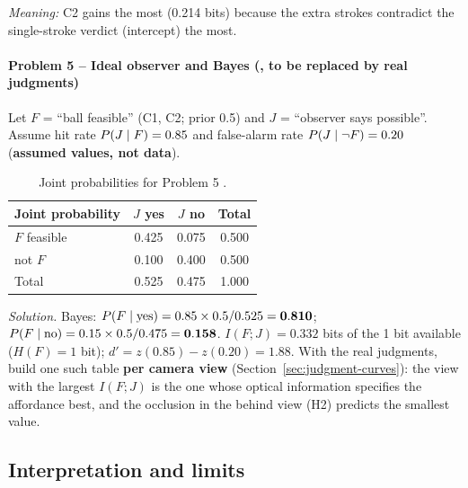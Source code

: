\emph{Meaning:} C2 gains the most (0.214 bits) because the extra strokes contradict the single-stroke verdict (intercept) the most.

\paragraph{Problem 5 -- Ideal observer and Bayes (\tagill{}, to be replaced by real judgments)} Let $F$ = ``ball feasible'' (C1, C2; prior 0.5) and $J$ = ``observer says possible''. Assume hit rate $P(J\mid F)=0.85$ and false-alarm rate $P(J\mid\neg F)=0.20$ (\textbf{assumed values, not data}).

\begin{table}[h]
    \centering
    \caption{Joint probabilities for Problem 5 \tagill.}\label{tab:p5}
    \footnotesize
    \begin{tabular}{@{}l c c c@{}}
        \toprule
        \textbf{Joint probability} & \textbf{$J$ yes} & \textbf{$J$ no} & \textbf{Total} \\
        \midrule
        $F$ feasible               & 0.425            & 0.075           & 0.500          \\
        not $F$                    & 0.100            & 0.400           & 0.500          \\
        Total                      & 0.525            & 0.475           & 1.000          \\
        \bottomrule
    \end{tabular}
\end{table}

\emph{Solution.} Bayes: $P(F\mid\text{yes})=0.85\times0.5/0.525=\mathbf{0.810}$; $P(F\mid\text{no})=0.15\times0.5/0.475=\mathbf{0.158}$. $I(F;J)=\mathbf{0.332}$ bits of the 1 bit available ($H(F)=1$ bit); $d'=z(0.85)-z(0.20)=\mathbf{1.88}$. With the real judgments, build one such table \textbf{per camera view} (Section~\ref{sec:judgment-curves}): the view with the largest $I(F;J)$ is the one whose optical information specifies the affordance best, and the occlusion in the behind view (H2) predicts the smallest value.

\subsection{Interpretation and limits}

